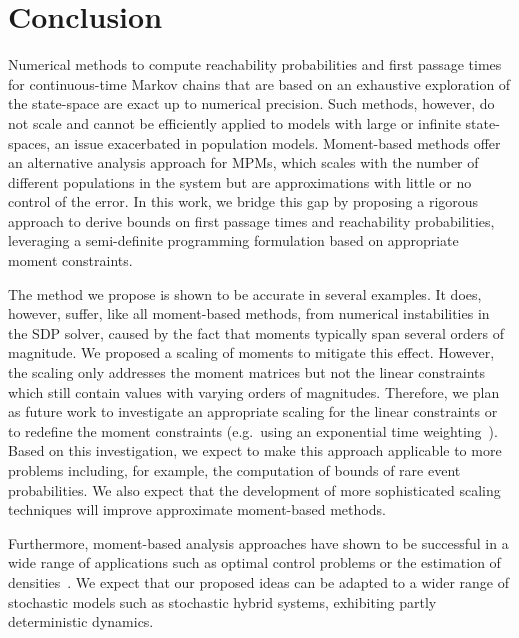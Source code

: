 \section{Conclusion}\label{sec:mfpt:conclusion}
Numerical methods to compute reachability probabilities and first passage times
for continuous-time Markov chains that are based on an exhaustive exploration of the state-space
are exact up to numerical precision. Such methods, however, do not scale and cannot be efficiently applied to models with large or infinite state-spaces,
an issue exacerbated in population models. Moment-based methods offer an alternative analysis approach
for \acp{MPM}, which scales with the number of different populations in the system
but are approximations with little or no control of the error.
In this work,
we bridge this gap by proposing a rigorous approach to derive bounds on first passage
times and reachability probabilities, leveraging a semi-definite programming formulation
based on appropriate moment constraints. 

The method we propose is shown to be accurate in several examples. It does, however, suffer, like all moment-based methods, from numerical instabilities in the \ac{SDP} solver, caused by the fact that moments typically span several orders of magnitude. We proposed a scaling of moments to mitigate this effect. 
However, the scaling only addresses the moment matrices but not the linear constraints
which still contain values with varying orders of magnitudes.
Therefore, we plan as future work to investigate an appropriate scaling for the linear constraints
or to redefine the moment
constraints (e.g.\ using an exponential time weighting~\cite{dowdy2018dynamic}).
Based on this investigation, we expect to make this approach applicable to
more problems including, for example, the computation of bounds of rare event probabilities.
We also expect that the development of more sophisticated scaling techniques will  improve approximate moment-based methods.

Furthermore, moment-based analysis approaches have shown to be successful
in a wide range of applications such as optimal control problems or the estimation
of densities~\cite{lasserre2010moments}.
We expect that our proposed ideas   can be adapted to a wider range
of stochastic models such as stochastic hybrid systems, exhibiting partly deterministic dynamics.

